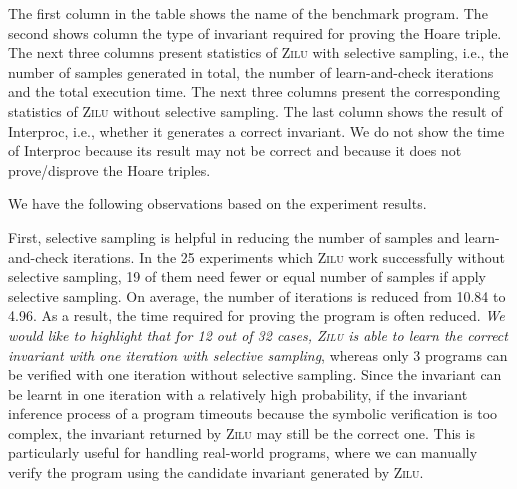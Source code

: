 The first column in the table shows the name of the benchmark program. 
The second shows column the type of invariant required for proving the Hoare triple. 
The next three columns present statistics of \textsc{Zilu} with selective sampling, i.e., the number of samples generated in total, the number of learn-and-check iterations and the total execution time. The next three columns present the corresponding statistics of \textsc{Zilu} without selective sampling.
The last column shows the result of Interproc, i.e., whether it generates a correct invariant. 
We do not show the time of Interproc because its result may not be correct and because it does not prove/disprove the Hoare triples.

We have the following observations based on the experiment results. 

First, selective sampling is helpful in reducing the number of samples and learn-and-check iterations.
In the 25 experiments which \textsc{Zilu} work successfully without selective sampling, 19 of them need fewer or equal number of samples if apply selective sampling.
On average, the number of iterations is reduced from 10.84 to 4.96. 
As a result, the time required for proving the program is often reduced.
\emph{We would like to highlight that for 12 out of 32 cases, 
\textsc{Zilu} is able to learn the correct invariant with one iteration with selective sampling}, 
whereas only 3 programs can be verified with one iteration without selective sampling. 
Since the invariant can be learnt in one iteration with a relatively high probability, 
if the invariant inference process of a program timeouts because the symbolic verification is too complex, 
the invariant returned by \textsc{Zilu} may still be the correct one. 
This is particularly useful for handling real-world programs, 
where we can manually verify the program using the candidate invariant generated by \textsc{Zilu}.


